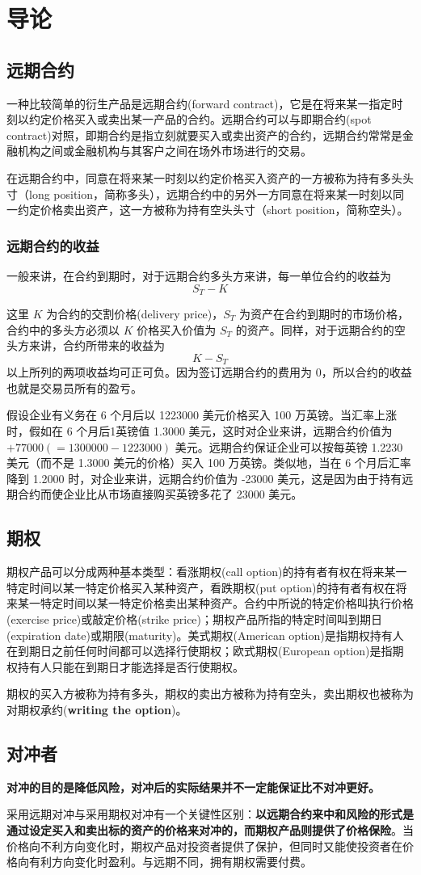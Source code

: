 \chapter{导论\label{ch01}}
\section{远期合约}
一种比较简单的衍生产品是远期合约(forward contract)，它是在将来某一指定时刻以约定价格买入或卖出某一产品的合约。远期合约可以与即期合约(spot contract)对照，即期合约是指立刻就要买入或卖出资产的合约，远期合约常常是金融机构之间或金融机构与其客户之间在场外市场进行的交易。

在远期合约中，同意在将来某一时刻以约定价格买入资产的一方被称为持有多头头寸（long position，简称多头），远期合约中的另外一方同意在将来某一时刻以同一约定价格卖出资产，这一方被称为持有空头头寸（short position，简称空头）。
\subsection{远期合约的收益}
一般来讲，在合约到期时，对于远期合约多头方来讲，每一单位合约的收益为
$$S_T-K$$

这里 $K$ 为合约的交割价格(delivery price)，$S_T$ 为资产在合约到期时的市场价格，合约中的多头方必须以 $K$ 价格买入价值为 $S_T$ 的资产。同样，对于远期合约的空头方来讲，合约所带来的收益为
$$K-S_T$$
以上所列的两项收益均可正可负。因为签订远期合约的费用为 0，所以合约的收益也就是交易员所有的盈亏。

假设企业有义务在 6 个月后以 1223000 美元价格买入 100 万英镑。当汇率上涨时，假如在 6 个月后1英镑值 1.3000 美元，这时对企业来讲，远期合约价值为 $+77000(=1300000-1223000)$ 美元。远期合约保证企业可以按每英镑 1.2230 美元（而不是 1.3000 美元的价格）买入 100 万英镑。类似地，当在 6 个月后汇率降到 1.2000 时，对企业来讲，远期合约价值为 -23000 美元，这是因为由于持有远期合约而使企业比从市场直接购买英镑多花了 23000 美元。

\section{期权}
期权产品可以分成两种基本类型：看涨期权(call option)的持有者有权在将来某一特定时间以某一特定价格买入某种资产，看跌期权(put option)的持有者有权在将来某一特定时间以某一特定价格卖出某种资产。合约中所说的特定价格叫执行价格(exercise price)或敲定价格(strike price)；期权产品所指的特定时间叫到期日(expiration date)或期限(maturity)。美式期权(American option)是指期权持有人在到期日之前任何时间都可以选择行使期权；欧式期权(European option)是指期权持有人只能在到期日才能选择是否行使期权。

期权的买入方被称为持有多头，期权的卖出方被称为持有空头，卖出期权也被称为对期权承约(\textbf{writing the option})。
\section{对冲者}
\textbf{对冲的目的是降低风险，对冲后的实际结果并不一定能保证比不对冲更好。}

采用远期对冲与采用期权对冲有一个关键性区别：\textbf{以远期合约来中和风险的形式是通过设定买入和卖出标的资产的价格来对冲的，而期权产品则提供了价格保险}。当价格向不利方向变化时，期权产品对投资者提供了保护，但同时又能使投资者在价格向有利方向变化时盈利。与远期不同，拥有期权需要付费。